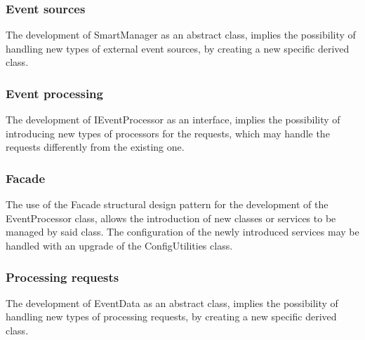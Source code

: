		\subsubsection{Event sources}
		The development of SmartManager as an abstract class, implies the possibility of handling new types of external event sources, by creating a new specific derived class.
		\subsubsection{Event processing}
		The development of IEventProcessor as an interface, implies the possibility of introducing new types of processors for the requests, which may handle the requests differently from the existing one.
		\subsubsection{Facade}
		The use of the Facade structural design pattern for the development of the EventProcessor class, allows the introduction of new classes or services to be managed by said class. The configuration of the newly introduced services may be handled with an upgrade of the ConfigUtilities class.
		\subsubsection{Processing requests}
		The development of EventData as an abstract class, implies the possibility of handling new types of processing requests, by creating a new specific derived class.
